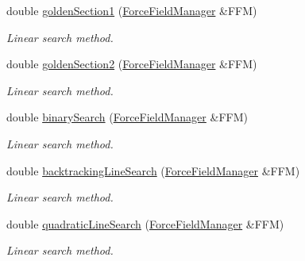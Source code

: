 {\bf }\par
\begin{DoxyCompactItemize}
\item 
double \hyperlink{classCGMethod_ace5a720fe0f5d6ffcefeb9f4afcfe28f}{golden\+Section1} (\hyperlink{classForceFieldManager}{Force\+Field\+Manager} \&F\+F\+M)
\begin{DoxyCompactList}\small\item\em Linear search method. \end{DoxyCompactList}\item 
double \hyperlink{classCGMethod_aa1fcbcd087af6fa3aa9aab67b0b60103}{golden\+Section2} (\hyperlink{classForceFieldManager}{Force\+Field\+Manager} \&F\+F\+M)
\begin{DoxyCompactList}\small\item\em Linear search method. \end{DoxyCompactList}\item 
double \hyperlink{classCGMethod_a2d9a41ddbf7d54e6f89ee02966c7d85c}{binary\+Search} (\hyperlink{classForceFieldManager}{Force\+Field\+Manager} \&F\+F\+M)
\begin{DoxyCompactList}\small\item\em Linear search method. \end{DoxyCompactList}\item 
double \hyperlink{classCGMethod_a432019c8a52f50b0cb8cb39b937db978}{backtracking\+Line\+Search} (\hyperlink{classForceFieldManager}{Force\+Field\+Manager} \&F\+F\+M)
\begin{DoxyCompactList}\small\item\em Linear search method. \end{DoxyCompactList}\item 
double \hyperlink{classCGMethod_aa77b006b710d67b248dd18517db7709c}{quadratic\+Line\+Search} (\hyperlink{classForceFieldManager}{Force\+Field\+Manager} \&F\+F\+M)
\begin{DoxyCompactList}\small\item\em Linear search method. \end{DoxyCompactList}\end{DoxyCompactItemize}


